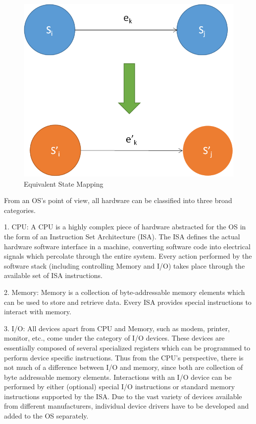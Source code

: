 \begin{figure}[H]
  \centering
  \includegraphics[scale=0.8]{figures/vir_phy_map.png}
  \caption[Equivalent State Mapping]{Equivalent State Mapping \cite{smith_nair}}
  \label{fig:statemap}
\end{figure}

From an OS's point of view, all hardware can be classified into three broad categories.

1. CPU: A CPU is a highly complex piece of hardware abstracted for the OS in the form of an Instruction Set Architecture (ISA). The ISA defines the actual hardware software interface in a machine, converting software code into electrical signals which percolate through the entire system. Every action performed by the software stack (including controlling Memory and I/O) takes place through the available set of ISA instructions.

2. Memory: Memory is a collection of byte-addressable memory elements which can be used to store and retrieve data. Every ISA provides special instructions to interact with memory.

3. I/O: All devices apart from CPU and Memory, such as modem, printer, monitor, etc., come under the category of I/O devices. These devices are essentially composed of several specialized registers which can be programmed to perform device specific instructions. Thus from the CPU’s perspective, there is not much of a difference between I/O and memory, since both are collection of byte addressable memory elements. Interactions with an I/O device can be performed by either (optional) special I/O instructions or standard memory instructions supported by the ISA. Due to the vast variety of devices available from different manufacturers, individual device drivers have to be developed and added to the OS separately.

